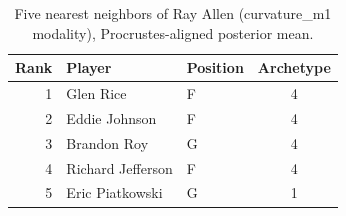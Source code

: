 \begin{table}[htbp]
  \centering\small
  \begin{tabular}{rllc}
    \toprule
    Rank & Player & Position & Archetype \\
    \midrule
    1 & Glen Rice & F & 4 \\
    2 & Eddie Johnson & F & 4 \\
    3 & Brandon Roy & G & 4 \\
    4 & Richard Jefferson & F & 4 \\
    5 & Eric Piatkowski & G & 1 \\
    \bottomrule
  \end{tabular}
  \caption{Five nearest neighbors of Ray Allen (curvature_m1 modality), Procrustes-aligned posterior mean.}
  \label{tab:Ray_Allen_neighbors_curvature_m1}
\end{table}


